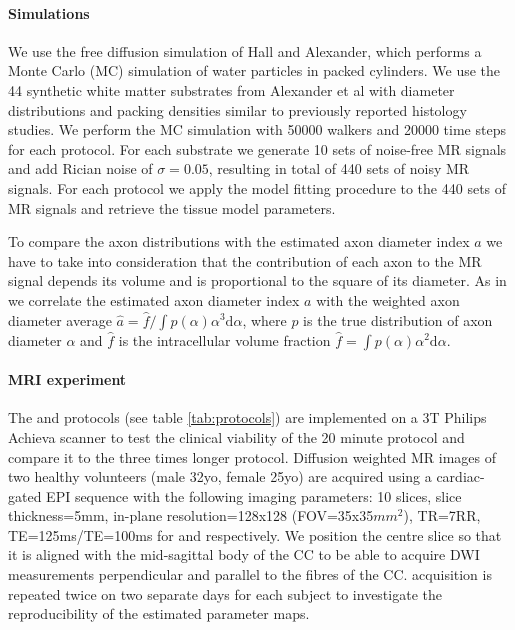 \paragraph{Simulations}
We use the free diffusion simulation of Hall and Alexander\cite{hall2008}, which performs a Monte Carlo (MC) simulation of water particles in packed cylinders. We use the 44 synthetic white matter substrates from Alexander et al\cite{alexander2009} with diameter distributions and packing densities similar to previously reported histology studies. %
We perform the MC simulation with 50000 walkers and 20000 time steps for each protocol. For each substrate we generate 10 sets of noise-free MR signals and add Rician noise of $\sigma=0.05$, resulting in  total of 440 sets of noisy MR signals. For each protocol we apply the model fitting procedure to the 440 sets of MR signals and retrieve the tissue model parameters. 

To compare the axon distributions with the estimated axon diameter index $a$ we have to take into consideration that the contribution of each axon to the MR signal depends its volume and is proportional to the square of its diameter. As in \cite{alexander2009} we correlate the estimated axon diameter index $a$ with the weighted axon diameter average $\hat{a} = \hat{f} / \int p(\alpha)\alpha^3\mbox{d}\alpha$, where $p$ is the true distribution of axon diameter $\alpha$ and $\hat{f}$ is the intracellular volume fraction $\hat{f} = \int p(\alpha)\alpha^2\mbox{d}\alpha.$

\paragraph{MRI experiment}
The \SFshort{} and \OIlong{} protocols (see table \ref{tab:protocols}) are implemented on a 3T Philips Achieva scanner to test the clinical viability of the 20 minute \SFshort{} protocol and compare it to the three times longer \OIlong{} protocol. Diffusion weighted MR images of two healthy volunteers (male 32yo, female 25yo) are acquired using a cardiac-gated EPI sequence with the following imaging parameters: 10 slices, slice thickness=5mm, in-plane resolution=128x128 (FOV=35x35$mm^2$), TR=7RR, TE=125ms/TE=100ms for \SFshort{} and \OIlong{} respectively. We position the centre slice so that it is aligned with the mid-sagittal body of the CC to be able to acquire DWI measurements perpendicular and parallel to the fibres of the CC. \SFshort{} acquisition is repeated twice on two separate days for each subject to investigate the reproducibility of the estimated parameter maps.
%
